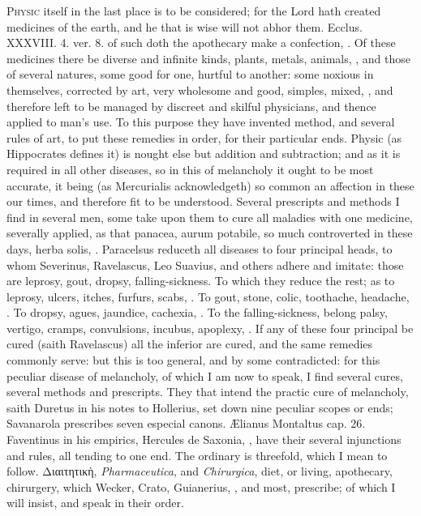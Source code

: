 {\lettrine{P}{hysic} itself in the last place is to be considered; for the Lord hath
created medicines of the earth, and he that is wise will not abhor
them. Ecclus. XXXVIII. 4. ver. 8. of such doth the apothecary
make a confection, \etc{}. Of these medicines there be diverse and infinite
kinds, plants, metals, animals, \etc{}, and those of several natures, some
good for one, hurtful to another: some noxious in themselves, corrected
by art, very wholesome and good, simples, mixed, \etc{}, and therefore
left to be managed by discreet and skilful physicians, and thence
applied to man's use. To this purpose they have invented method, and
several rules of art, to put these remedies in order, for their
particular ends. Physic (as Hippocrates defines it) is nought else but
addition and subtraction; and as it is required in all other
diseases, so in this of melancholy it ought to be most accurate, it
being (as Mercurialis acknowledgeth) so common an affection in
these our times, and therefore fit to be understood. Several prescripts
and methods I find in several men, some take upon them to cure all
maladies with one medicine, severally applied, as that panacea, aurum
potabile, so much controverted in these days, herba solis, \etc{}.
Paracelsus reduceth all diseases to four principal heads, to whom
Severinus, Ravelascus, Leo Suavius, and others adhere and imitate:
those are leprosy, gout, dropsy, falling-sickness. To which they reduce
the rest; as to leprosy, ulcers, itches, furfurs, scabs, \etc{}. To gout,
stone, colic, toothache, headache, \etc{}. To dropsy, agues, jaundice,
cachexia, \etc{}. To the falling-sickness, belong palsy, vertigo, cramps,
convulsions, incubus, apoplexy, \etc{}. If any of these four
principal be cured (saith Ravelascus) all the inferior are cured, and
the same remedies commonly serve: but this is too general, and by some
contradicted: for this peculiar disease of melancholy, of which I am
now to speak, I find several cures, several methods and prescripts.
They that intend the practic cure of melancholy, saith Duretus in his
notes to Hollerius, set down nine peculiar scopes or ends; Savanarola
prescribes seven especial canons. \AE{}lianus Montaltus cap. 26.
Faventinus in his empirics, Hercules de Saxonia, \etc{}, have their
several injunctions and rules, all tending to one end. The ordinary is
threefold, which I mean to follow. \textgreek[variant=ancient]{Διαιτητικὴ}, \emph{Pharmaceutica}, and
\emph{Chirurgica}, diet, or living, apothecary, chirurgery, which Wecker,
Crato, Guianerius, \etc{}, and most, prescribe; of which I will insist,
and speak in their order.


}
